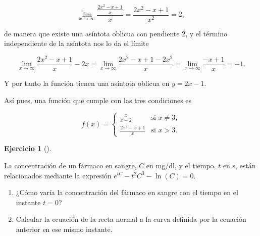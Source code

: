\documentclass[
  a4paper,
]{scrreport}
\theoremstyle{definition}
\newtheorem{exercise}{Ejercicio}[chapter]
\theoremstyle{remark}
\begin{document}
\begin{tcolorbox}
\[
\lim_{x\to\infty} \frac{\frac{2x^2-x+1}{x}}{x} 
= \frac{2x^2-x+1}{x^2} = 2,
\]

de manera que existe una asíntota oblicua con pendiente \(2\), y el
término independiente de la asíntota nos lo da el límite

\[
\lim_{x\to\infty} \frac{2x^2-x+1}{x}-2x
= \lim_{x\to\infty} \frac{2x^2-x+1-2x^2}{x} 
= \lim_{x\to\infty} \frac{-x+1}{x}
=-1.
\]

Y por tanto la función tienen una asíntota oblicua en \(y=2x-1\).

Así pues, una función que cumple con las tres condiciones es

\[
f(x) =
\begin{cases}
\frac{x}{x-2} & \mbox{si } x\neq 3,\\
\frac{2x^2-x+1}{x} & \mbox{si } x>3.
\end{cases}
\]

\end{tcolorbox}

\begin{exercise}[]\protect\hypertarget{exr-5}{}\label{exr-5}

La concentración de un fármaco en sangre, \(C\) en mg/dl, y el tiempo,
\(t\) en s, están relacionados mediante la expresión
\(e^{tC}-t^2C^3-\ln(C)=0\).

\begin{enumerate}
\def\labelenumi{\alph{enumi}.}
\item
  ¿Cómo varía la concentración del fármaco en sangre con el tiempo en el
  instante \(t=0\)?
\item
  Calcular la ecuación de la recta normal a la curva definida por la
  ecuación anterior en ese mismo instante.
\end{enumerate}

\end{exercise}
\end{document}
